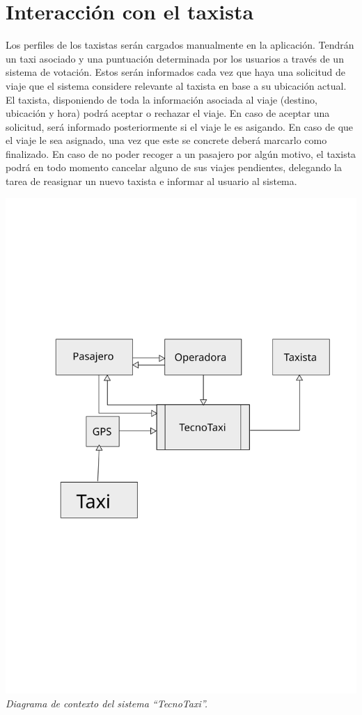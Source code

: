 \section{Interacción con el taxista}
Los perfiles de los taxistas serán cargados manualmente en la aplicación. Tendrán un taxi asociado y una puntuación determinada por los usuarios a través de un sistema de votación. Estos serán informados cada vez que haya una solicitud de viaje que el sistema considere relevante al taxista en base a su ubicación actual. El taxista, disponiendo de toda la información asociada al viaje (destino, ubicación y hora) podrá aceptar o rechazar el viaje. En caso de aceptar una solicitud, será informado posteriormente si el viaje le es asigando. En caso de que el viaje le sea asignado, una vez que este se concrete deberá marcarlo como finalizado. En caso de no poder recoger a un pasajero por algún motivo, el taxista podrá en todo momento cancelar alguno de sus viajes pendientes, delegando la tarea de reasignar un nuevo taxista e informar al usuario al sistema.

\vspace{\baselineskip}
        \begin{center}
		    \includegraphics[scale=0.60]{contexto.svg}
		    \\
		    \vspace{1pt}
		    \footnotesize\textit{Diagrama de contexto del sistema “TecnoTaxi”.}
	    \end{center}
    \vspace{\baselineskip}
\par 
\newpage
